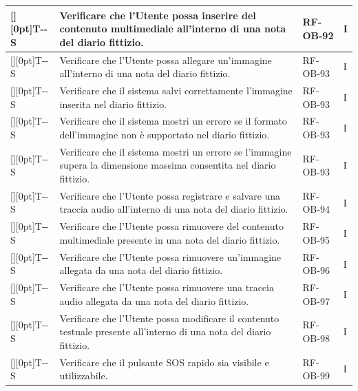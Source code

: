 \documentclass[a4paper,12pt]{article}
\newcounter{testsys}
\newcommand{\systestcode}{%
  \raisebox{0pt}[\height][0pt]{\hypertarget{T-\arabic{testsys}-S}{}}T-\arabic{testsys}-S%
}
\begin{document}
\begin{longtable}{| >{\centering\arraybackslash}p{} | >{\raggedright\arraybackslash}p{} | >{\centering\arraybackslash}p{} | >{\centering\arraybackslash}p{} |}
\stepcounter{testsys} \systestcode & Verificare che l'Utente possa inserire del contenuto multimediale all'interno di una nota del diario fittizio. & RF-OB-92 & I \\
\hline

\stepcounter{testsys} \systestcode & Verificare che l'Utente possa allegare un'immagine all'interno di una nota del diario fittizio. & RF-OB-93 & I \\
\hline

\stepcounter{testsys} \systestcode & Verificare che il sistema salvi correttamente l'immagine inserita nel diario fittizio. & RF-OB-93 & I \\
\hline

\stepcounter{testsys} \systestcode & Verificare che il sistema mostri un errore se il formato dell'immagine non è supportato nel diario fittizio. & RF-OB-93 & I \\
\hline

\stepcounter{testsys} \systestcode & Verificare che il sistema mostri un errore se l'immagine supera la dimensione massima consentita nel diario fittizio. & RF-OB-93 & I \\
\hline

\stepcounter{testsys} \systestcode & Verificare che l'Utente possa registrare e salvare una traccia audio all'interno di una nota del diario fittizio. & RF-OB-94 & I \\
\hline

\stepcounter{testsys} \systestcode & Verificare che l'Utente possa rimuovere del contenuto multimediale presente in una nota del diario fittizio. & RF-OB-95 & I \\
\hline

\stepcounter{testsys} \systestcode & Verificare che l'Utente possa rimuovere un'immagine allegata da una nota del diario fittizio. & RF-OB-96 & I \\
\hline

\stepcounter{testsys} \systestcode & Verificare che l'Utente possa rimuovere una traccia audio allegata da una nota del diario fittizio. & RF-OB-97 & I \\
\hline

\stepcounter{testsys} \systestcode & Verificare che l'Utente possa modificare il contenuto testuale presente all'interno di una nota del diario fittizio. & RF-OB-98 & I \\
\hline
\hline

\stepcounter{testsys} \systestcode & Verificare che il pulsante SOS rapido sia visibile e utilizzabile. & RF-OB-99 & I \\
\hline


\end{longtable}
\end{document}
